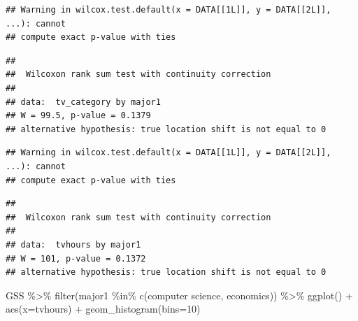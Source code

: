\documentclass[
]{book}
\newenvironment{Shaded}{\begin{snugshade}}{\end{snugshade}}
\newcommand{\AttributeTok}[1]{\textcolor[rgb]{0.77,0.63,0.00}{#1}}
\newcommand{\DecValTok}[1]{\textcolor[rgb]{0.00,0.00,0.81}{#1}}
\newcommand{\FunctionTok}[1]{\textcolor[rgb]{0.00,0.00,0.00}{#1}}
\newcommand{\NormalTok}[1]{#1}
\newcommand{\SpecialCharTok}[1]{\textcolor[rgb]{0.00,0.00,0.00}{#1}}
\newcommand{\StringTok}[1]{\textcolor[rgb]{0.31,0.60,0.02}{#1}}
\theoremstyle{definition}
\theoremstyle{definition}
\theoremstyle{definition}
\theoremstyle{definition}
\theoremstyle{remark}
\begin{document}
\begin{verbatim}
## Warning in wilcox.test.default(x = DATA[[1L]], y = DATA[[2L]], ...): cannot
## compute exact p-value with ties
\end{verbatim}

\begin{verbatim}
## 
##  Wilcoxon rank sum test with continuity correction
## 
## data:  tv_category by major1
## W = 99.5, p-value = 0.1379
## alternative hypothesis: true location shift is not equal to 0
\end{verbatim}

\begin{Shaded}
\end{Shaded}

\begin{verbatim}
## Warning in wilcox.test.default(x = DATA[[1L]], y = DATA[[2L]], ...): cannot
## compute exact p-value with ties
\end{verbatim}

\begin{verbatim}
## 
##  Wilcoxon rank sum test with continuity correction
## 
## data:  tvhours by major1
## W = 101, p-value = 0.1372
## alternative hypothesis: true location shift is not equal to 0
\end{verbatim}

\begin{Shaded}
\begin{Highlighting}[]
\NormalTok{GSS }\SpecialCharTok{\%\textgreater{}\%} 
  \FunctionTok{filter}\NormalTok{(major1 }\SpecialCharTok{\%in\%} \FunctionTok{c}\NormalTok{(}\StringTok{\textquotesingle{}computer science\textquotesingle{}}\NormalTok{, }\StringTok{\textquotesingle{}economics\textquotesingle{}}\NormalTok{)) }\SpecialCharTok{\%\textgreater{}\%} 
  \FunctionTok{ggplot}\NormalTok{() }\SpecialCharTok{+} 
  \FunctionTok{aes}\NormalTok{(}\AttributeTok{x=}\NormalTok{tvhours) }\SpecialCharTok{+} 
  \FunctionTok{geom\_histogram}\NormalTok{(}\AttributeTok{bins=}\DecValTok{10}\NormalTok{)}
\end{Highlighting}
\end{Shaded}
\end{document}
